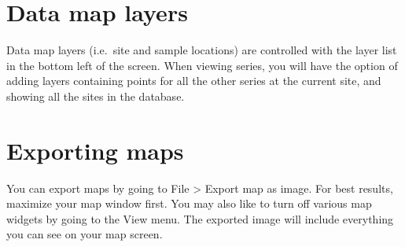 \section{Data map layers}
Data map layers (i.e.\ site and sample locations) are controlled with the layer list in the bottom left of the screen. When viewing series, you will have the option of adding layers containing points for all the other series at the current site, and showing all the sites in the database. 


\section{Exporting maps}

You can export maps by going to File > Export map as image. For best results, maximize your map window first. You may also like to turn off various map widgets by going to the View menu. The exported image will include everything you can see on your map screen. 
